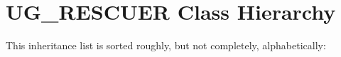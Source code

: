 \section{UG\_\-RESCUER Class Hierarchy}
This inheritance list is sorted roughly, but not completely, alphabetically:\begin{CompactList}
\item {}
\begin{CompactList}
\item {}
\item {}
\end{CompactList}
\end{CompactList}
